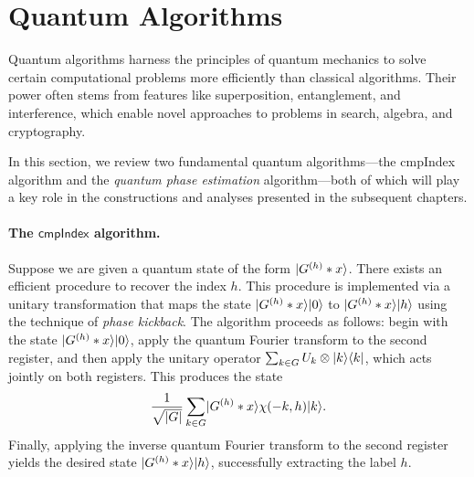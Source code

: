 \documentclass[12pt]{report}
\newcommand{\cas}{\mathrm{cas}}
\newcommand{\qht}{\mathsf{QHT}}
\newcommand{\qft}{\mathsf{QFT}}
\newcommand{\comph}{\mathsf{cmpIndex}}
\begin{document}




\section{Quantum Algorithms}


Quantum algorithms harness the principles of quantum mechanics to solve certain computational problems more efficiently than classical algorithms. Their power often stems from features like superposition, entanglement, and interference, which enable novel approaches to problems in search, algebra, and cryptography.

In this section, we review two fundamental quantum algorithms—the \textsf{cmpIndex} algorithm and the \textit{quantum phase estimation} algorithm—both of which will play a key role in the constructions and analyses presented in the subsequent chapters.

\paragraph{The $\comph$ algorithm.}
Suppose we are given a quantum state of the form $\lvert G^{(h)} * x\rangle$. There exists an efficient procedure to recover the index $h$. This procedure is implemented via a unitary transformation that maps the state $\lvert G^{(h)} * x\rangle \lvert0\rangle$ to $\lvert G^{(h)} * x\rangle \lvert h\rangle$ using the technique of \emph{phase kickback}. The algorithm proceeds as follows: begin with the state $\lvert G^{(h)} * x\rangle \lvert0\rangle$, apply the quantum Fourier transform to the second register, and then apply the unitary operator $\sum_{k \in G} U_k \otimes \lvert k\rangle \langle k\rvert$, which acts jointly on both registers. This produces the state
\[
\frac{1}{\sqrt{\lvert G\rvert}} \sum_{k \in G} \lvert G^{(h)} * x\rangle \chi(-k, h) \lvert k\rangle.
\]
Finally, applying the inverse quantum Fourier transform to the second register yields the desired state $\lvert G^{(h)} * x\rangle \lvert h\rangle$, successfully extracting the label $h$.
\end{document}
